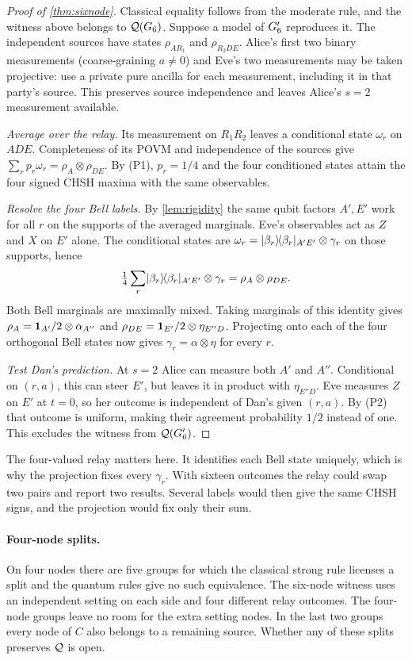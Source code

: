\begin{proof}[Proof of \cref{thm:sixnode}]
Classical equality follows from the moderate rule, and the witness above belongs to $\mathcal{Q}(G_6)$.
Suppose a model of $G_6'$ reproduces it. The independent sources have states $\rho_{AR_1}$ and
$\rho_{R_2DE}$. Alice's first two binary measurements (coarse-graining $a\ne0$) and Eve's two
measurements may be taken projective: use a private pure ancilla for each measurement, including it
in that party's source. This preserves source independence and leaves Alice's $s=2$ measurement available.

\emph{Average over the relay.} Its measurement on $R_1R_2$ leaves a conditional state $\omega_r$ on
$ADE$. Completeness of its POVM and independence of the sources give
$\sum_r p_r\omega_r=\rho_A\otimes\rho_{DE}$. By (P1), $p_r=1/4$ and the four conditioned states
attain the four signed CHSH maxima with the same observables.

\emph{Resolve the four Bell labels.} By \cref{lem:rigidity} the same qubit factors $A',E'$ work for
all $r$ on the supports of the averaged marginals. Eve's observables act as $Z$ and $X$ on $E'$ alone.
The conditional states are $\omega_r=\lvert \beta_r\rangle\!\langle \beta_r\rvert_{A'E'}\otimes\gamma_r$ on those supports, hence
\[
 \tfrac14\sum_r\lvert \beta_r\rangle\!\langle \beta_r\rvert_{A'E'}\otimes\gamma_r=\rho_A\otimes\rho_{DE}.
\]
Both Bell marginals are maximally mixed. Taking marginals of this identity gives
$\rho_A=\mathbf{1}_{A'}/2\otimes\alpha_{A''}$ and $\rho_{DE}=\mathbf{1}_{E'}/2\otimes\eta_{E''D}$.
Projecting onto each of the four orthogonal Bell states now gives $\gamma_r=\alpha\otimes\eta$
for every $r$.

\emph{Test Dan's prediction.} At $s=2$ Alice can measure both $A'$ and $A''$. Conditional on $(r,a)$,
this can steer $E'$, but leaves it in product with $\eta_{E''D}$. Eve measures $Z$ on $E'$ at $t=0$,
so her outcome is independent of Dan's given $(r,a)$. By (P2) that outcome is uniform, making their
agreement probability $1/2$ instead of one. This excludes the witness from $\mathcal{Q}(G_6')$.
\end{proof}

The four-valued relay matters here. It identifies each Bell state uniquely, which is why the projection
fixes every $\gamma_r$. With sixteen outcomes the relay could swap two pairs and report two results.
Several labels would then give the same CHSH signs, and the projection would fix only their sum.

\paragraph{Four-node splits.}\label{sec:open-four}
On four nodes there are five groups for which the classical strong rule licenses a split and the
quantum rules give no such equivalence. The six-node witness uses an independent setting on each side and four different relay outcomes.
The four-node groups leave no room for the extra setting nodes. In the last two groups every node of
$C$ also belongs to a remaining source. Whether any of these splits preserves $\mathcal{Q}$ is open.

